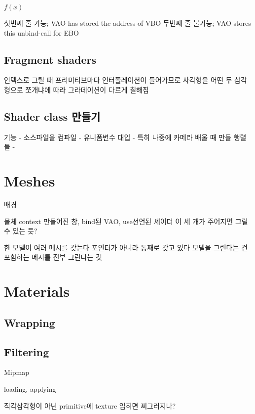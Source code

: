 \documentclass[a4paper]{report}
\begin{document}
$f(x)$

첫번째 줄 가능; VAO has stored the address of VBO
두번째 줄 불가능; VAO stores this unbind-call for EBO




\section{Fragment shaders}


인덱스로 그릴 때 프리미티브마다 인터폴레이션이 들어가므로 사각형을 어떤 두 삼각형으로 쪼개냐에 따라 그라데이션이 다르게 칠해짐




\section{Shader class 만들기}
기능
- 소스파일을 컴파일
- 유니폼변수 대입
	- 특히 나중에 카메라 배울 때 만들 행렬들
- 




\chapter{Meshes}




배경 


물체
	context 만들어진 창, bind된 VAO, use선언된 셰이더
	이 세 개가 주어지면 그릴 수 있는 듯?


한 모델이 여러 메시를 갖는다
포인터가 아니라 통째로 갖고 있다
모델을 그린다는 건 포함하는 메시를 전부 그린다는 것

\chapter{Materials}






\section{Wrapping}

\section{Filtering}



Mipmap

loading, applying


직각삼각형이 아닌 primitive에 texture 입히면 찌그러지나?
\end{document}
